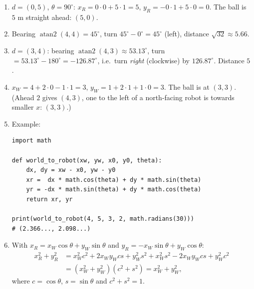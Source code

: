 \begin{enumerate}[label=\textbf{\ansnum.\arabic*}]
  \item $d=(0,5)$, $\theta=90^\circ$: $x_R=0\cdot0+5\cdot1=5$, $y_R=-0\cdot1+5\cdot0=0$. The ball is $5$ m straight ahead: $(5,0)$.
  \item Bearing $\operatorname{atan2}(4,4)=45^\circ$, turn $45^\circ-0^\circ=45^\circ$ (left), distance $\sqrt{32}\approx5.66$.
  \item $d=(3,4)$: bearing $\operatorname{atan2}(4,3)\approx53.13^\circ$, turn $=53.13^\circ-180^\circ=-126.87^\circ$, i.e.\ turn \emph{right} (clockwise) by $126.87^\circ$. Distance $5$.
  \item $x_W=4+2\cdot0-1\cdot1=3$, $y_W=1+2\cdot1+1\cdot0=3$. The ball is at $(3,3)$. (Ahead $2$ gives $(4,3)$, one to the left of a north-facing robot is towards smaller $x$: $(3,3)$.)
  \item Example:
\begin{verbatim}
import math

def world_to_robot(xw, yw, x0, y0, theta):
    dx, dy = xw - x0, yw - y0
    xr =  dx * math.cos(theta) + dy * math.sin(theta)
    yr = -dx * math.sin(theta) + dy * math.cos(theta)
    return xr, yr

print(world_to_robot(4, 5, 3, 2, math.radians(30)))
# (2.366..., 2.098...)
\end{verbatim}
  \item With $x_R=x_W\cos\theta+y_W\sin\theta$ and $y_R=-x_W\sin\theta+y_W\cos\theta$:
  \begin{align*}
  x_R^2+y_R^2&=x_W^2c^2+2x_Wy_Wcs+y_W^2s^2+x_W^2s^2-2x_Wy_Wcs+y_W^2c^2\\
  &=(x_W^2+y_W^2)(c^2+s^2)=x_W^2+y_W^2,
  \end{align*}
  where $c=\cos\theta$, $s=\sin\theta$ and $c^2+s^2=1$.
\end{enumerate}
